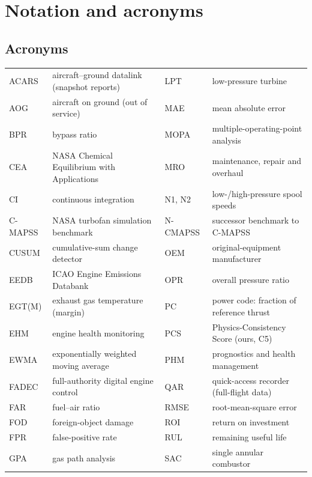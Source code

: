 \chapter*{Notation and acronyms}

\section*{Acronyms}

\begin{center}\footnotesize
\setlength{\tabcolsep}{4pt}
\begin{tabular}{@{}p{}p{}p{}p{}@{}}
  \toprule
  ACARS & aircraft--ground datalink (snapshot reports) & LPT & low-pressure turbine \\
  AOG & aircraft on ground (out of service) & MAE & mean absolute error \\
  BPR & bypass ratio & MOPA & multiple-operating-point analysis \\
  CEA & NASA Chemical Equilibrium with Applications & MRO & maintenance, repair and overhaul \\
  CI & continuous integration & N1, N2 & low-/high-pressure spool speeds \\
  C-MAPSS & NASA turbofan simulation benchmark & N-CMAPSS & successor benchmark to C-MAPSS \\
  CUSUM & cumulative-sum change detector & OEM & original-equipment manufacturer \\
  EEDB & ICAO Engine Emissions Databank & OPR & overall pressure ratio \\
  EGT(M) & exhaust gas temperature (margin) & PC & power code: fraction of reference thrust \\
  EHM & engine health monitoring & PCS & Physics-Consistency Score (ours, C5) \\
  EWMA & exponentially weighted moving average & PHM & prognostics and health management \\
  FADEC & full-authority digital engine control & QAR & quick-access recorder (full-flight data) \\
  FAR & fuel--air ratio & RMSE & root-mean-square error \\
  FOD & foreign-object damage & ROI & return on investment \\
  FPR & false-positive rate & RUL & remaining useful life \\
  GPA & gas path analysis & SAC & single annular combustor \\

\end{tabular}
\end{center}
